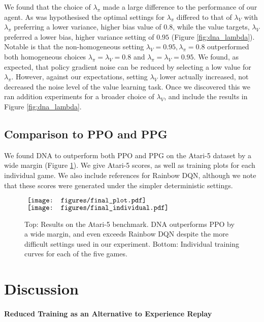\documentclass{article}
\begin{document}
We found that the choice of $\lambda_\pi$ made a large difference to the performance of our agent. As was hypothesised the optimal settings for $\lambda_\pi$ differed to that of $\lambda_V$ with $\lambda_\pi$ preferring a lower variance, higher bias value of $0.8$, while the value targets, $\lambda_V$ preferred a lower bias, higher variance setting of $0.95$ (Figure \ref{fig:dna_lambda}). Notable is that the non-homogeneous setting $\lambda_V=0.95, \lambda_\pi=0.8$ outperformed both homogeneous choices $\lambda_\pi=\lambda_V=0.8$ and $\lambda_\pi=\lambda_V=0.95$. We found, as expected, that policy gradient noise can be reduced by selecting a low value for $\lambda_\pi$. However, against our expectations, setting $\lambda_V$ lower actually increased, not decreased the noise level of the value learning task. Once we discovered this we ran addition experiments for a broader choice of $\lambda_V$, and include the results in Figure \ref{fig:dna_lambda}.

\subsection{Comparison to PPO and PPG}

We found DNA to outperform both PPO and PPG on the Atari-5 dataset by a wide margin (Figure \ref{fig:final_plot}). We give Atari-5 scores, as well as training plots for each individual game. We also include references for Rainbow DQN, although we note that these scores were generated under the simpler deterministic settings.

\begin{figure}[t]
    \centering
    $\vcenter{\hbox{
    \texttt{[image: figures/final\_plot.pdf]}}}$
    $\vcenter{\hbox{
    \texttt{[image: figures/final\_individual.pdf]}
    }}$
    \caption{Top: Results on the Atari-5 benchmark. DNA outperforms PPO by a wide margin, and even exceeds Rainbow DQN despite the more difficult settings used in our experiment. Bottom: Individual training curves for each of the five games.}
    \label{fig:final_plot}
\end{figure}

\section{Discussion}
\label{sec:discussion}

\paragraph{Reduced Training as an Alternative to Experience Replay}
\end{document}
